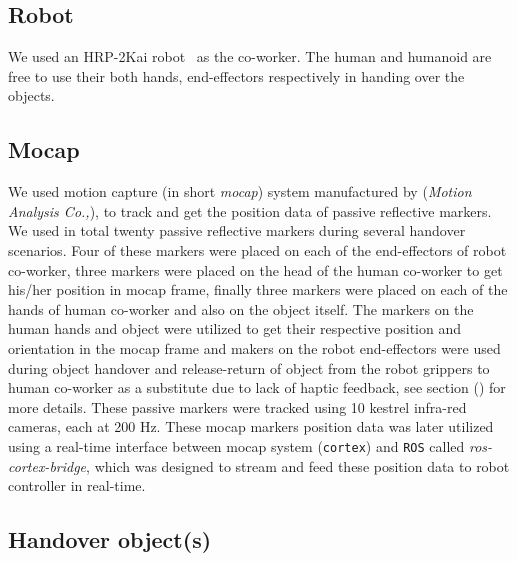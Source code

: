 

\subsection{Robot}

We used an HRP-2Kai robot~\cite{Kaneko:RAS_ICHR:2015} as the co-worker. The human and humanoid are free to use their both hands, end-effectors respectively in handing over the objects.

\subsection{Mocap}

We used motion capture (in short \textit{mocap}) system manufactured by ({\it Motion Analysis Co.,}), to track and get the position data of passive reflective markers. We used in total twenty passive reflective markers during several handover scenarios. Four of these markers were placed on each of the end-effectors of robot co-worker, three markers were placed on the head of the human co-worker to get his/her position in mocap frame, finally three markers were placed on each of the hands of human co-worker and also on the object itself. The markers on the human hands and object were utilized to get their respective position and orientation in the mocap frame and makers on the robot end-effectors were used during object handover and release-return of object from  the robot grippers to human co-worker as a substitute due to lack of haptic feedback, see section () for more details. These passive markers were tracked using 10 kestrel infra-red cameras, each at 200 Hz. These mocap markers position data was later utilized using a real-time interface between mocap system (\texttt{cortex}) and \texttt{ROS} called \textit{ros-cortex-bridge}, which was designed to stream and feed these position data to robot controller in real-time.

\subsection{Handover object(s)}

